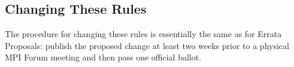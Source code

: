 
\subsection{Changing These Rules}

The procedure for changing these rules is essentially the same as for
Errata Proposals: publish the proposed change at least two weeks prior
to a physical MPI Forum meeting and then pass one official ballot.

{\color{red}{The new rules take effect as soon as they are
  approved/voted in by the MPI Forum.}}

